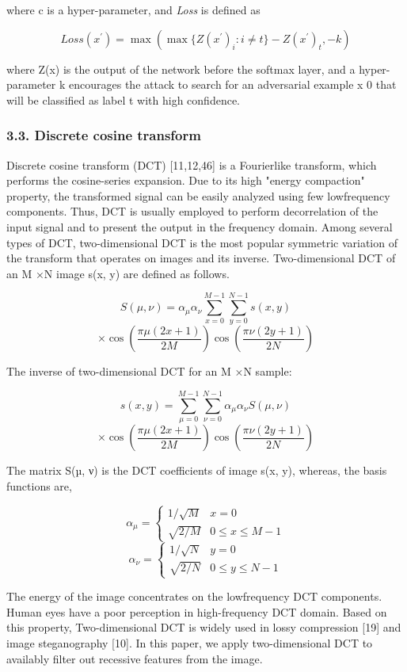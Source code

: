 \documentclass{article}
\begin{document}
where c is a hyper-parameter, and \textit{Loss} is defined as

$$Loss(x^{\prime})=\max(\max\{Z(x^{\prime})_{i}:i\neq t\}-Z(x^{\prime})_{t},-k)\tag{4}$$

where Z(x) is the output of the network before the softmax layer, and a hyper-parameter k encourages the attack to search for an adversarial example x 0 that will be classified as label t with high confidence.

\subsubsection{3.3. Discrete cosine transform}

Discrete cosine transform (DCT) [11,12,46] is a Fourierlike transform, which performs the cosine-series expansion. Due to its high "energy compaction" property, the transformed signal can be easily analyzed using few lowfrequency components. Thus, DCT is usually employed to perform decorrelation of the input signal and to present the output in the frequency domain. Among several types of DCT, two-dimensional DCT is the most popular symmetric variation of the transform that operates on images and its inverse. Two-dimensional DCT of an M ×N image s(x, y) are defined as follows.

$$S(\mu,\nu)=\alpha_{\mu}\alpha_{\nu}\sum_{x=0}^{M-1}\sum_{y=0}^{N-1}s(x,y)\tag{5}$$ $$\times\cos(\frac{\pi\mu(2x+1)}{2M})\cos(\frac{\pi\nu(2y+1)}{2N})$$

The inverse of two-dimensional DCT for an M ×N sample:

$$s(x,y)=\sum_{\mu=0}^{M-1}\sum_{\nu=0}^{N-1}\alpha_{\mu}\alpha_{\nu}S(\mu,\nu)\tag{6}$$ $$\times\cos(\frac{\pi\mu(2x+1)}{2M})\cos(\frac{\pi\nu(2y+1)}{2N})$$

The matrix S(µ, ν) is the DCT coefficients of image s(x, y), whereas, the basis functions are,

$$\alpha_{\mu}=\begin{cases}1/\sqrt{M}&x=0\\ \sqrt{2/M}&0\leq x\leq M-1\end{cases}\tag{7}$$ $$\alpha_{\nu}=\begin{cases}1/\sqrt{N}&y=0\\ \sqrt{2/N}&0\leq y\leq N-1\end{cases}$$

The energy of the image concentrates on the lowfrequency DCT components. Human eyes have a poor perception in high-frequency DCT domain. Based on this property, Two-dimensional DCT is widely used in lossy compression [19] and image steganography [10]. In this paper, we apply two-dimensional DCT to availably filter out recessive features from the image.
\end{document}
